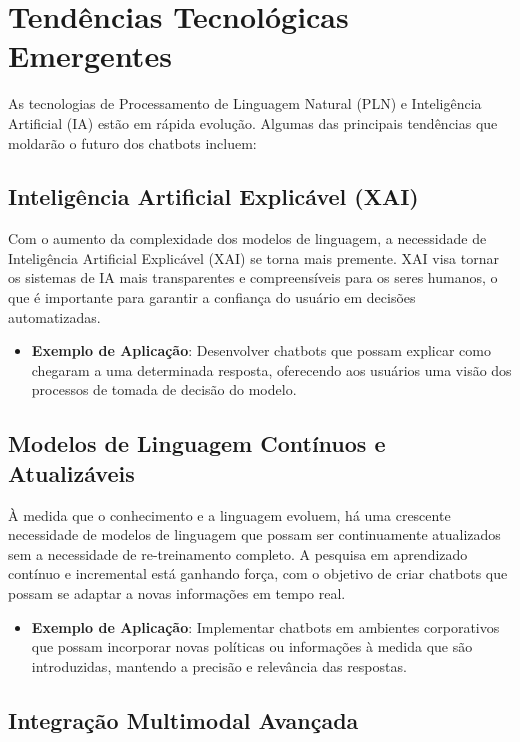 \documentclass[14pt,a4paper,oneside]{book}
\begin{document}
\section{Tendências Tecnológicas Emergentes}

As tecnologias de Processamento de Linguagem Natural (PLN) e Inteligência Artificial (IA) estão em rápida evolução. Algumas das principais tendências que moldarão o futuro dos chatbots incluem:

\subsection{Inteligência Artificial Explicável (XAI)}

Com o aumento da complexidade dos modelos de linguagem, a necessidade de Inteligência Artificial Explicável (XAI) se torna mais premente. XAI visa tornar os sistemas de IA mais transparentes e compreensíveis para os seres humanos, o que é importante para garantir a confiança do usuário em decisões automatizadas.

\begin{itemize}
	\item \textbf{Exemplo de Aplicação}: Desenvolver chatbots que possam explicar como chegaram a uma determinada resposta, oferecendo aos usuários uma visão dos processos de tomada de decisão do modelo.
\end{itemize}

\subsection{Modelos de Linguagem Contínuos e Atualizáveis}

À medida que o conhecimento e a linguagem evoluem, há uma crescente necessidade de modelos de linguagem que possam ser continuamente atualizados sem a necessidade de re-treinamento completo. A pesquisa em aprendizado contínuo e incremental está ganhando força, com o objetivo de criar chatbots que possam se adaptar a novas informações em tempo real.

\begin{itemize}
	\item \textbf{Exemplo de Aplicação}: Implementar chatbots em ambientes corporativos que possam incorporar novas políticas ou informações à medida que são introduzidas, mantendo a precisão e relevância das respostas.
\end{itemize}

\subsection{Integração Multimodal Avançada}
\end{document}

